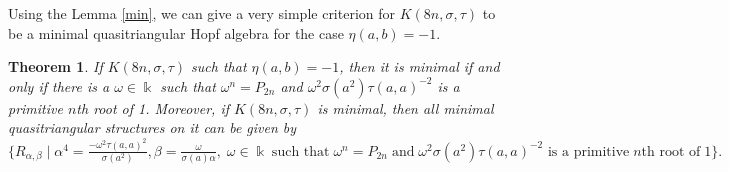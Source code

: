 \documentclass[a4paper,11pt]{amsart}
\numberwithin{equation}{section}
\newtheorem{theorem}{Theorem}[section]
\begin{document}
Using the Lemma \ref{min}, we can give a very simple criterion for $K(8n,\sigma,\tau)$ to be a minimal quasitriangular Hopf algebra for the case $\eta(a,b)=-1$.
\begin{theorem}\label{thm4.1}
If $K(8n,\sigma,\tau)$ such that $\eta(a,b)=-1$, then it is minimal if and only if there is a $\omega \in \Bbbk$ such that $\omega^n=P_{2n}$ and $\omega^2 \sigma(a^2)\tau(a,a)^{-2}$ is a primitive $n$th root of 1. Moreover, if $K(8n,\sigma,\tau)$ is minimal, then all minimal quasitriangular structures on it can be given by
 $\{R_{\alpha,\beta}\;|\; \alpha^4=\frac{-\omega^2\tau(a,a)^2}{\sigma(a^2)}, \beta=\frac{\omega}{\sigma(a)\alpha},\;\omega \in \Bbbk \; \text{such that}\; \omega^n=P_{2n} \;\text{and} \; \omega^2 \sigma(a^2) \tau(a,a)^{-2} \text{ is a primitive} \;n\text{th root of}\;1\}.$
\end{theorem}
\end{document}
